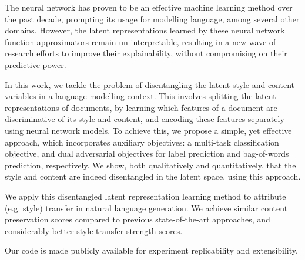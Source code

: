 The neural network has proven to be an effective machine learning method over the past decade, prompting its usage for modelling language, among several other domains. However, the latent representations learned by these neural network function approximators remain un-interpretable, resulting in a new wave of research efforts to improve their explainability, without compromising on their predictive power.

In this work, we tackle the problem of disentangling the latent style and content variables in a language modelling context. This involves splitting the latent representations of documents, by learning which features of a document are discriminative of its style and content, and encoding these features separately using neural network models. To achieve this, we propose a simple, yet effective approach, which incorporates auxiliary objectives: a multi-task classification objective, and dual adversarial objectives for label prediction and bag-of-words prediction, respectively. We show, both qualitatively and quantitatively, that the style and content are indeed disentangled in the latent space, using this approach.

We apply this disentangled latent representation learning method to attribute (e.g. style) transfer in natural language generation. We achieve similar content preservation scores compared to previous state-of-the-art approaches, and considerably better style-transfer strength scores.

Our code is made publicly available for experiment replicability and extensibility.

